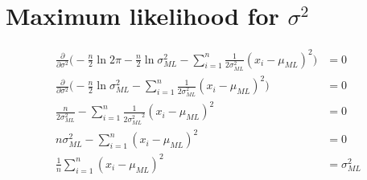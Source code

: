 \section{Maximum likelihood for \texorpdfstring{$\sigma^2$}{the standard deviation}}\label{AP:s2_ML}

\begin{equation}\label{eq:ap_derivative_sigma}
\begin{split}
    \frac{\partial }{\partial \sigma^2 } \big( - \frac{n}{2} \ln{2 \pi} - \frac{n}{2} \ln{\sigma^2_{ML}} - \sum_{i=1}^{n} \frac{1}{2\sigma^2_{ML}}(x_i - \mu_{ML})^2 \big) &= 0\\
    \frac{\partial}{\partial \sigma^2} \big( - \frac{n}{2} \ln{\sigma^2_{ML}}  - \sum_{i=1}^{n} \frac{1}{2\sigma^2_{ML}}(x_i - \mu_{ML})^2 \big) &= 0\\
    \frac{n}{2\sigma^2_{ML}} - \sum_{i=1}^{n} \frac{1}{2{\sigma^2_{ML}}^2}(x_i - \mu_{ML})^2 &= 0\\
    n\sigma^2_{ML} - \sum_{i=1}^{n} (x_i - \mu_{ML})^2 &= 0\\
    \frac{1}{n} \sum_{i=1}^{n} (x_i - \mu_{ML})^2 &= \sigma^2_{ML}\\
\end{split}
\end{equation}
